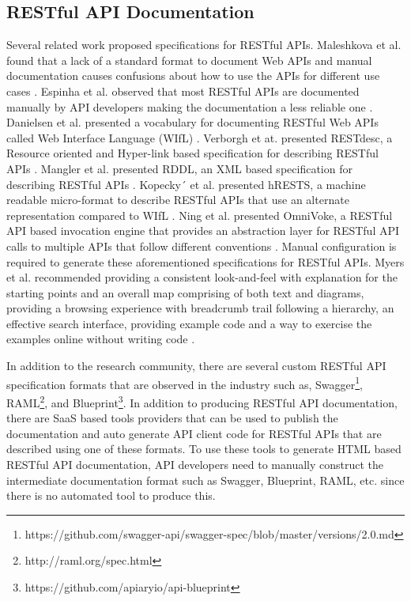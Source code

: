\subsection{RESTful API Documentation} %
\label{sub:restful_api_documentation}

Several related work proposed specifications for RESTful APIs. Maleshkova et al. found that a lack of a standard format to document Web APIs and manual documentation causes confusions about how to use the APIs for different use cases \cite{Maleshkova_investigating}. Espinha et al. observed that most RESTful APIs are documented manually by API developers making the documentation a less reliable one \cite{Espinha_web}. Danielsen et al. presented a vocabulary for documenting RESTful Web APIs called Web Interface Language (WIfL) \cite{Danielsen_validation}. Verborgh et at. presented RESTdesc, a Resource oriented and Hyper-link based specification for describing RESTful APIs \cite{Verborgh_functional}. Mangler et al. presented RDDL, an XML based specification for describing RESTful APIs \cite{Mangler_rddl}. Kopecky´ et al. presented hRESTS, a machine readable micro-format to describe RESTful APIs that use an alternate representation compared to WIfL \cite{Kopecky_hrests}. Ning et al. presented OmniVoke, a RESTful API based invocation engine that provides an abstraction layer for RESTful API calls to multiple APIs that follow different conventions \cite{Ning_omnivoke}. Manual configuration is required to generate these aforementioned specifications for RESTful APIs. Myers et al. recommended providing a consistent look-and-feel with explanation for the starting points and an overall map comprising of both text and diagrams, providing a browsing experience with breadcrumb trail following a hierarchy, an effective search interface, providing example code and a way to exercise the examples online without writing code \cite{Myers_study}.

In addition to the research community, there are several custom RESTful API specification formats that are observed in the industry such as, Swagger\footnote{https://github.com/swagger-api/swagger-spec/blob/master/versions/2.0.md}, RAML\footnote{http://raml.org/spec.html}, and Blueprint\footnote{https://github.com/apiaryio/api-blueprint}. In addition to producing RESTful API documentation, there are SaaS based tools providers that can be used to publish the documentation and auto generate API client code for RESTful APIs that are described using one of these formats. To use these tools to generate HTML based RESTful API documentation, API developers need to manually construct the intermediate documentation format such as Swagger, Blueprint, RAML, etc. since there is no automated tool to produce this.


